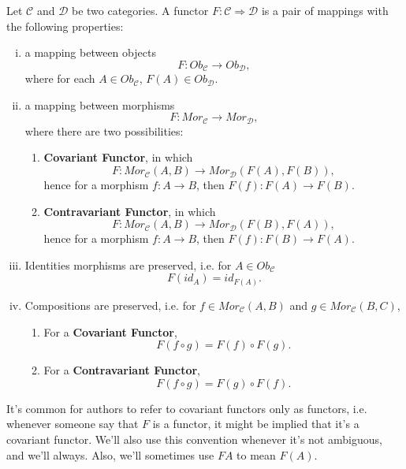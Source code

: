 \begin{definition}[Functor]
  Let $\mathcal C$ and $\mathcal D$ be two categories. A functor $F: \mathcal C \Rightarrow \mathcal D$ is
  a pair of mappings with the following properties:
  \begin{enumerate}[(i)]
    \item a mapping between objects
      \begin{displaymath}
        F:Ob_\mathcal C \to Ob_\mathcal D,
      \end{displaymath}
      where for each $A \in Ob_\mathcal C$, $F(A) \in Ob_\mathcal D$.
    \item a mapping between morphisms
      \begin{displaymath}
        F:Mor_\mathcal C \to Mor_\mathcal D,
      \end{displaymath}
      where there are two possibilities:
      \begin{enumerate}
        \item \textbf{Covariant Functor}, in which
          \begin{displaymath}
            F:Mor_\mathcal C(A,B) \to Mor_\mathcal D (F(A),F(B)),
          \end{displaymath}
          hence for a morphism $f:A \to B$, then $F(f):F(A) \to F(B)$.
        \item \textbf{Contravariant Functor}, in which
          \begin{displaymath}
            F:Mor_\mathcal C(A,B) \to Mor_\mathcal D (F(B),F(A)),
          \end{displaymath}
          hence for a morphism $f:A \to B$, then $F(f):F(B) \to F(A)$.
      \end{enumerate}
    \item Identities morphisms are preserved, i.e. for $A \in Ob_\mathcal C$
        \begin{displaymath}
          F(id_A) =  id_{F(A)}.
        \end{displaymath}
    \item Compositions are preserved, i.e. for $f \in Mor_\mathcal C(A,B)$
      and $ g \in Mor_\mathcal C(B,C)$,
      \begin{enumerate}
        \item For a \textbf{Covariant Functor},
          \begin{displaymath}
            F(f \circ g) = F(f) \circ F(g).
          \end{displaymath}
        \item For a \textbf{Contravariant Functor},
          \begin{displaymath}
            F(f \circ g) = F(g) \circ F(f).
          \end{displaymath}
      \end{enumerate}
  \end{enumerate}
  It's common for authors to refer to covariant functors only as functors, i.e.
  whenever someone say that $F$ is a functor, it might be implied that it's a covariant functor.
  We'll also use this convention whenever it's not ambiguous, and we'll always.
  Also, we'll sometimes use $FA$ to mean $F(A)$.
\end{definition}

